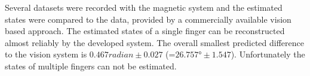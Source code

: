Several datasets were recorded with the magnetic system and the estimated states were compared to the data, provided by a commercially available vision based approach. The estimated states of a single finger can be reconstructed almost reliably by the developed system. The overall smallest predicted difference to the vision system is $ 0.467 \si{radian} \pm 0.027 $ (=$ 26.757 \si{\degree} \pm 1.547 $). Unfortunately the states of multiple fingers can not be estimated.





